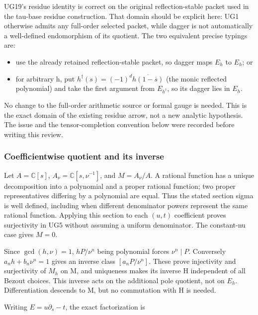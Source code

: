 UG19's residue identity is correct on the original reflection-stable packet used in the tau-base residue construction. That domain should be explicit here: UG1 otherwise admits any full-order selected packet, while dagger is not automatically a well-defined endomorphism of its quotient. The two equivalent precise typings are:

\begin{itemize}
\tightlist
\item
  use the already retained reflection-stable packet, so dagger maps \(E_h\) to \(E_h\); or
\item
  for arbitrary h, put \(h^\dagger(s)=(-1)^d\overline{h(1-\overline s)}\) (the monic reflected polynomial) and take the first argument from \(E_{h^\dagger}\), so its dagger lies in \(E_h\).
\end{itemize}

No change to the full-order arithmetic source or formal gauge is needed. This is the exact domain of the existing residue arrow, not a new analytic hypothesis. The issue and the tensor-completion convention below were recorded before writing this review.

\subsubsection{Coefficientwise quotient and its inverse}\label{endpoint-f1_unit_gauge_review--coefficientwise-quotient-and-its-inverse}

Let \(A=\mathbb C[s]\), \(A_\nu=\mathbb C[s,\nu^{-1}]\), and \(M=A_\nu/A\). A rational function has a unique decomposition into a polynomial and a proper rational function; two proper representatives differing by a polynomial are equal. Thus the stated section sigma is well defined, including when different denominator powers represent the same rational function. Applying this section to each \((u,t)\) coefficient proves surjectivity in UG5 without assuming a uniform denominator. The constant-nu case gives \(M=0\).

Since \(\gcd(h,\nu)=1\), \(hP/\nu^n\) being polynomial forces \(\nu^n\mid P\). Conversely \(a_n h+b_n\nu^n=1\) gives an inverse class \([a_n P/\nu^n]\). These prove injectivity and surjectivity of \(M_h\) on M, and uniqueness makes its inverse H independent of all Bezout choices. This inverse acts on the additional pole quotient, not on \(E_h\). Differentiation descends to M, but no commutation with H is needed.

Writing \(E=u\partial_s-t\), the exact factorization is

